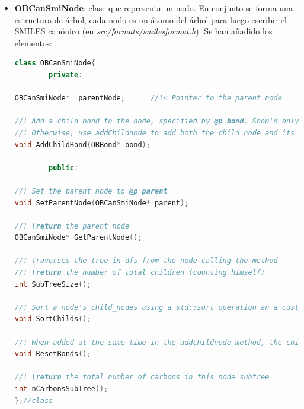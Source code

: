 \begin{itemize}
\begin{lstlisting}[language=C++]
//Adds information to the molecule of the blocks that form it. Being a block, each set of atoms that, due to their bonds, are within the same parenthesis in the original input Smiles. Or, according to the OBMol2Cansmi::BuildCanonTree method, the parent-child relationship between atoms.
void IdentifyBranches(OBMol& mol,OBCanSmiNode* node, BranchBlock* branch = nullptr);

//Modifies the tree built by BuildCanonTree based on the length of the branches identified in IdentifyBranches. This is a canonical rule designed for a little more consistency in the output canon smiles.
void RearrangeTree(OBCanSmiNode* node);

//Builds the SMILES tree, in canonical order, for the specified molecular fragment. Based on the BuildCanonTree method. Shares much of the code, with some changes in the neighbour selection algorithm.
bool BuildCanonTreeOgm(OBMol& mol, OBBitVec& frag_atoms, vector<unsigned int>& canonical_order, OBCanSmiNode* node);
};//class
    \end{lstlisting}


    \item \textbf{OBCanSmiNode}: clase que representa un nodo. En conjunto se forma una estructura de árbol, cada nodo es un átomo del árbol para luego escribir el SMILES canónico (en \textit{src/formats/smilesformat.h}). Se han añadido los elementos:
    \begin{lstlisting}[language=C++]
class OBCanSmiNode{
        private: 
    
OBCanSmiNode* _parentNode;      //!< Pointer to the parent node

//! Add a child bond to the node, specified by @p bond. Should only be used in the ResetBonds method as a part of the OBMol2Cansmi::RearrangeTree algorithm.
//! Otherwise, use addChildnode to add both the child node and its respective bonds
void AddChildBond(OBBond* bond);

        public: 

//! Set the parent node to @p parent
void SetParentNode(OBCanSmiNode* parent);

//! \return the parent node
OBCanSmiNode* GetParentNode();

//! Traverses the tree in dfs from the node calling the method
//! \return the number of total children (counting himself) 
int SubTreeSize();

//! Sort a node's child_nodes using a std::sort operation an a custom comparator 'mycomp'
void SortChilds();

//! When added at the same time in the addchildnode method, the child with its bond have a 1 to 1 index correspondence. When reordering the children, in OBMol2Cansmi::RearrangeTree, the indices of the bonds are lost. This method clears and adds the bonds back in order.
void ResetBonds();

//! \return the total number of carbons in this node subtree
int nCarbonsSubTree();
};//class
    \end{lstlisting}

\end{itemize}
